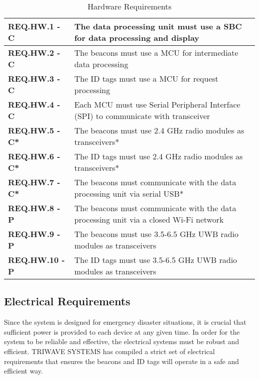 \bigskip

\bgroup
\def\arraystretch{1.5}
\begin{table}[H]
\centering
\begin{tabular}{ | m{3.25cm} | m{12.5cm} |}
 \hline
 \textbf{REQ.HW.1 - C} & The data processing unit must use a \Gls{SBC} for data processing and display \\
\hline
 \textbf{REQ.HW.2 - C} & The beacons must use a MCU for intermediate data processing \\
\hline
 \textbf{REQ.HW.3 - C} & The ID tags must use a MCU for request processing \\
\hline
 \textbf{REQ.HW.4 - C} & Each MCU must use Serial Peripheral Interface (SPI) to communicate with transceiver \\
\hline
 \textbf{REQ.HW.5 - C*} & The beacons must use 2.4 GHz radio modules as transceivers* \\
\hline
 \textbf{REQ.HW.6 - C*} & The ID tags must use 2.4 GHz radio modules as transceivers*  \\
\hline
 \textbf{REQ.HW.7 - C*} & The beacons must communicate with the data processing unit via serial USB* \\
\hline
 \textbf{REQ.HW.8 - P} & The beacons must communicate with the data processing unit via a closed Wi-Fi network \\
\hline
 \textbf{REQ.HW.9 - P} & The beacons must use 3.5-6.5 GHz UWB radio modules as transceivers \\
\hline
 \textbf{REQ.HW.10 - P} & The ID tags must use 3.5-6.5 GHz UWB radio modules as transceivers \\
\hline
\end{tabular}
\caption{Hardware Requirements}
\end{table}

\break
\subsection{Electrical Requirements}
Since the system is designed for emergency disaster situations, it is crucial that sufficient power is provided to each device at any given time. In order for the system to be reliable and effective, the electrical systems must be robust and efficient. TRIWAVE SYSTEMS has compiled a strict set of electrical requirements that ensures the beacons and ID tags will operate in a safe and efficient way.

\bigskip

